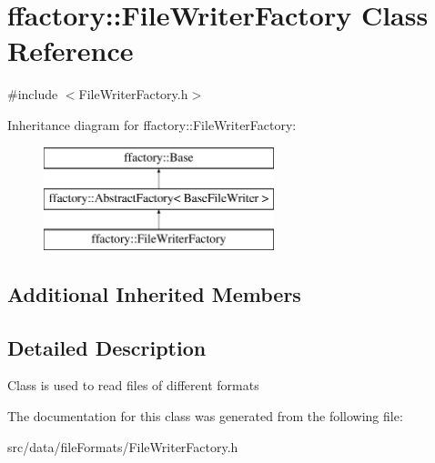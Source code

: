 \hypertarget{classffactory_1_1_file_writer_factory}{\section{ffactory\-:\-:File\-Writer\-Factory Class Reference}
\label{classffactory_1_1_file_writer_factory}
}


{\ttfamily \#include $<$File\-Writer\-Factory.\-h$>$}

Inheritance diagram for ffactory\-:\-:File\-Writer\-Factory\-:\begin{figure}[H]
\begin{center}
\leavevmode
\includegraphics[height=3.000000cm]{classffactory_1_1_file_writer_factory}
\end{center}
\end{figure}
\subsection*{Additional Inherited Members}


\subsection{Detailed Description}
Class is used to read files of different formats 

The documentation for this class was generated from the following file\-:\begin{DoxyCompactItemize}
\item 
src/data/file\-Formats/File\-Writer\-Factory.\-h\end{DoxyCompactItemize}
